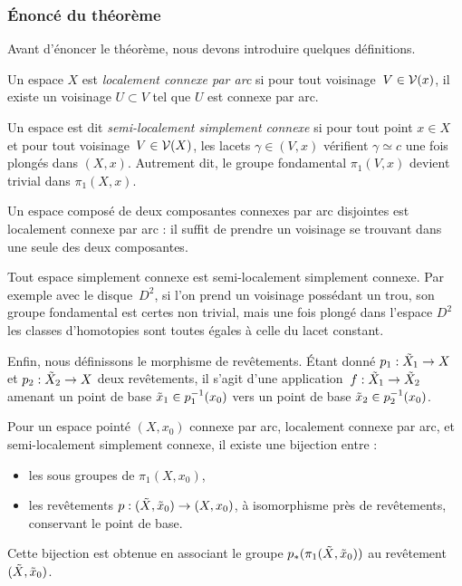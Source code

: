 \subsubsection{Énoncé du théorème}

Avant d'énoncer le théorème, nous devons introduire quelques définitions.

\begin{definition}
Un espace $X$ est \emph{localement connexe par arc} si pour tout voisinage~$V\in\mathcal{V}(x)$, il existe un voisinage $U\subset V$ tel que $U$ est connexe par arc.

Un espace est dit \emph{semi-localement simplement connexe} si pour tout point $x\in X$ et pour tout voisinage~${V\in\mathcal{V}(X)}$, les lacets $\gamma\in (V, x)$ vérifient $\gamma\simeq c$ une fois plongés dans $(X, x)$. Autrement dit, le groupe fondamental $\pi_1(V,x)$ devient trivial dans $\pi_1(X,x)$.
\end{definition}

\begin{exemple}
Un espace composé de deux composantes connexes par arc disjointes est localement connexe par arc : il suffit de prendre un voisinage se trouvant dans une seule des deux composantes.

Tout espace simplement connexe est semi-localement simplement connexe. Par exemple avec le disque~$D^2$, si l'on prend un voisinage possédant un trou, son groupe fondamental est certes non trivial, mais une fois plongé dans l'espace $D^2$ les classes d'homotopies sont toutes égales à celle du lacet constant.
\end{exemple}

Enfin, nous définissons le morphisme de revêtements. Étant donné ${p_1:\Tilde{X}_1\to X}$ et $p_2:\Tilde{X}_2\to X$ deux revêtements, il s'agit d'une application~${f:\Tilde{X}_1\to\Tilde{X}_2}$ amenant un point de base $\Tilde{x}_1\in p_1^{-1}(x_0)$ vers un point de base $\Tilde{x}_2\in p_2^{-1}(x_0)$.

\begin{theorem}
Pour un espace pointé $(X,x_0)$ connexe par arc, localement connexe par arc, et semi-localement simplement connexe, il existe une bijection entre :\begin{itemize}
    \item les sous groupes de $\pi_1(X,x_0)$,
    \item les revêtements $p:(\Tilde{X},\Tilde{x}_0)\to(X,x_0)$, à isomorphisme près de revêtements, conservant le point de base.
\end{itemize} Cette bijection est obtenue en associant le groupe $p_\ast(\pi_1(\Tilde{X},\Tilde{x}_0))$ au revêtement $(\Tilde{X},\Tilde{x}_0)$.
\end{theorem}

